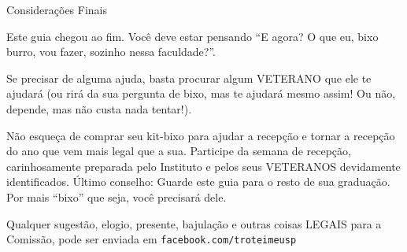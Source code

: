 \begin{secao}{Considerações Finais}

Este guia chegou ao fim. Você deve estar pensando ``E agora? O que eu, bixo
burro, vou fazer, sozinho nessa faculdade?''.

Se precisar de alguma ajuda, basta procurar algum VETERANO que ele te
ajudará (ou rirá da sua pergunta de bixo, mas te ajudará mesmo assim! Ou não,
depende, mas não custa nada tentar!).

Não esqueça de comprar seu kit-bixo para ajudar a recepção e tornar a recepção
do ano que vem mais legal que a sua. Participe da semana de recepção,
carinhosamente preparada pelo Instituto e pelos seus VETERANOS devidamente
identificados. Último conselho: Guarde este guia para o resto de sua graduação.
Por mais ``bixo'' que seja, você precisará dele.

Qualquer sugestão, elogio, presente, bajulação e outras coisas LEGAIS para a
Comissão, pode ser enviada em {\tt facebook.com/troteimeusp}

\end{secao}
